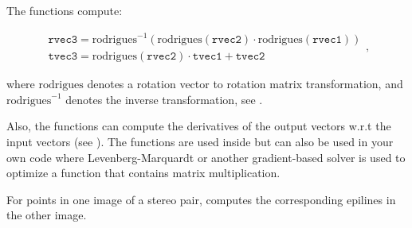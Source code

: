 \begin{description}
\end{description}

The functions compute:

\[ \begin{array}{l}
\texttt{rvec3} = \mathrm{rodrigues}^{-1}\left(\mathrm{rodrigues}(\texttt{rvec2}) \cdot
\mathrm{rodrigues}(\texttt{rvec1})\right) \\
\texttt{tvec3} = \mathrm{rodrigues}(\texttt{rvec2}) \cdot \texttt{tvec1} + \texttt{tvec2}
\end{array}, \]

where $\mathrm{rodrigues}$ denotes a rotation vector to rotation matrix transformation, and $\mathrm{rodrigues}^{-1}$ denotes the inverse transformation, see .

Also, the functions can compute the derivatives of the output vectors w.r.t the input vectors (see ).
The functions are used inside  but can also be used in your own code where Levenberg-Marquardt or another gradient-based solver is used to optimize a function that contains matrix multiplication.


For points in one image of a stereo pair, computes the corresponding epilines in the other image.

